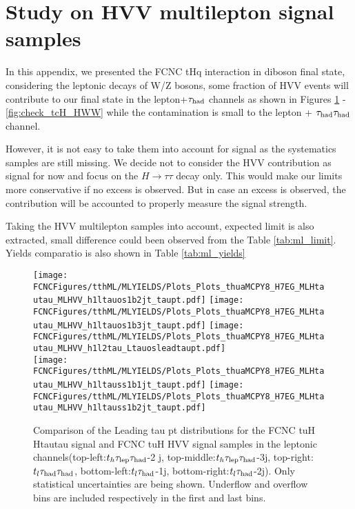 \section{Study on HVV multilepton signal samples}
\label{sec:HVVML}

In this appendix, we presented the FCNC tHq interaction in diboson final state, considering the leptonic decays of W/Z bosons, some fraction of HVV events will contribute to our final state in the lepton+$\tau_\text{had}$ channels as shown in Figures \ref{fig:check_tuH_HWW} - \ref{fig:check_tcH_HWW} while the contamination is
small to the lepton + $\tau_\text{had}{}\tau_\text{had}$ channel.

However, it is not easy to take them into account for signal as the systematics samples are still missing. We decide not to consider the HVV contribution as signal for now
and focus on the $H\rightarrow \tau\tau$ decay only. This would make our limits more conservative if no excess is observed. But in case an excess is observed, the contribution will be accounted to properly measure the signal strength.

Taking the HVV multilepton samples into account, expected limit is also extracted, small difference could been observed from the Table \ref{tab:ml_limit}. Yields comparatio is also shown in Table \ref{tab:ml_yields} 



\begin{figure}[htb]
  \centering
  \texttt{[image: \\FCNCFigures/tthML/MLYIELDS/Plots\_Plots\_thuaMCPY8\_H7EG\_MLHtautau\_MLHVV\_h1ltauos1b2jt\_taupt.pdf]}
  \texttt{[image: \\FCNCFigures/tthML/MLYIELDS/Plots\_Plots\_thuaMCPY8\_H7EG\_MLHtautau\_MLHVV\_h1ltauos1b3jt\_taupt.pdf]}
  \texttt{[image: \\FCNCFigures/tthML/MLYIELDS/Plots\_Plots\_thuaMCPY8\_H7EG\_MLHtautau\_MLHVV\_h1l2tau\_Ltauosleadtaupt.pdf]}
\\
\texttt{[image: \\FCNCFigures/tthML/MLYIELDS/Plots\_Plots\_thuaMCPY8\_H7EG\_MLHtautau\_MLHVV\_h1ltauss1b1jt\_taupt.pdf]}
\texttt{[image: \\FCNCFigures/tthML/MLYIELDS/Plots\_Plots\_thuaMCPY8\_H7EG\_MLHtautau\_MLHVV\_h1ltauss1b2jt\_taupt.pdf]}
\\
\caption{ Comparison of the Leading tau pt distributions for the FCNC tuH Htautau signal and FCNC tuH HVV signal samples in the leptonic channels(top-left:$t_h\tau_\text{lep}{}\tau_\text{had}$-2
j, top-middle:$t_h\tau_\text{lep}{}\tau_\text{had}$-3j, top-right:$t_l\tau_\text{had}{}\tau_\text{had}$, bottom-left:$t_l\tau_\text{had}$-1j, bottom-right:$t_l\tau_\text{had}$-2j). Only statistical uncertainties are being shown. Underflow and overflow bins are included respectively in the first and last bins.}
\label{fig:check_tuH_HWW}
\end{figure}


